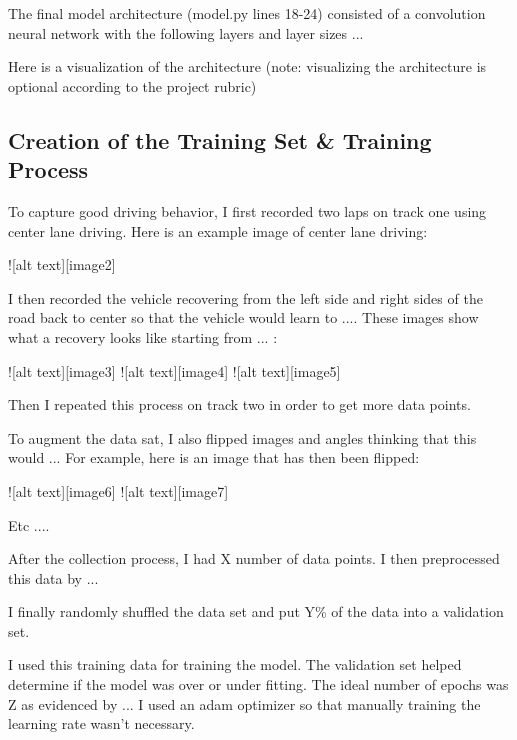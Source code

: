 \documentclass[a4paper, 11pt, DIV=14]{scrartcl}
\begin{document}
The final model architecture (model.py lines 18-24) consisted of a convolution neural network with the following layers and layer sizes ...

Here is a visualization of the architecture (note: visualizing the architecture is optional according to the project rubric)



\subsection{Creation of the Training Set \& Training Process}

To capture good driving behavior, I first recorded two laps on track one using center lane driving. Here is an example image of center lane driving:

![alt text][image2]

I then recorded the vehicle recovering from the left side and right sides of the road back to center so that the vehicle would learn to .... These images show what a recovery looks like starting from ... :

![alt text][image3]
![alt text][image4]
![alt text][image5]

Then I repeated this process on track two in order to get more data points.

To augment the data sat, I also flipped images and angles thinking that this would ... For example, here is an image that has then been flipped:

![alt text][image6]
![alt text][image7]

Etc ....

After the collection process, I had X number of data points. I then preprocessed this data by ...


I finally randomly shuffled the data set and put Y\% of the data into a validation set. 

I used this training data for training the model. The validation set helped determine if the model was over or under fitting. The ideal number of epochs was Z as evidenced by ... I used an adam optimizer so that manually training the learning rate wasn't necessary.


\printbibliography
\end{document}

